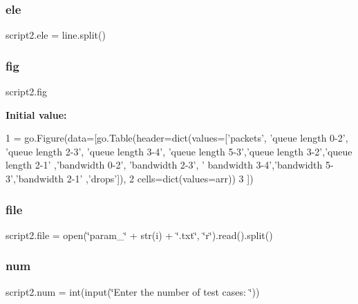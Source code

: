 \mbox{\label{namespacescript2_adb4ccec0b31df97301835925fae0ec8a}} 
\subsubsection{\texorpdfstring{ele}{ele}}
{\footnotesize\ttfamily script2.\+ele = line.\+split()}

\mbox{\label{namespacescript2_a7cda007e1b2a324fb0dcbcd6ff394b24}} 
\subsubsection{\texorpdfstring{fig}{fig}}
{\footnotesize\ttfamily script2.\+fig}

{\bfseries Initial value\+:}
\begin{DoxyCode}
1 =  go.Figure(data=[go.Table(header=dict(values=[\textcolor{stringliteral}{'packets'}, \textcolor{stringliteral}{'queue length 0-2'}, \textcolor{stringliteral}{'queue length 2-3'}, \textcolor{stringliteral}{'queue
       length 3-4'}, \textcolor{stringliteral}{'queue length 5-3'},\textcolor{stringliteral}{'queue length 3-2'},\textcolor{stringliteral}{'queue length 2-1'} ,\textcolor{stringliteral}{'bandwidth 0-2'}, \textcolor{stringliteral}{'bandwidth 2-3'}, \textcolor{stringliteral}{'
      bandwidth 3-4'},\textcolor{stringliteral}{'bandwidth 5-3'},\textcolor{stringliteral}{'bandwidth 2-1'} ,\textcolor{stringliteral}{'drops'}]),
2                  cells=dict(values=arr))
3                      ])
\end{DoxyCode}
\mbox{\label{namespacescript2_a01b4abff0d1a04692461f7309f242afd}} 
\subsubsection{\texorpdfstring{file}{file}}
{\footnotesize\ttfamily script2.\+file = open(\char`\"{}param\+\_\+\char`\"{} + str(i) + \char`\"{}.txt\char`\"{}, \char`\"{}r\char`\"{}).read().split()}

\mbox{\label{namespacescript2_a4d0e358cc326deb13af00979a4b354d8}} 
\subsubsection{\texorpdfstring{num}{num}}
{\footnotesize\ttfamily script2.\+num = int(input(\char`\"{}Enter the number of test cases\+: \char`\"{}))}


